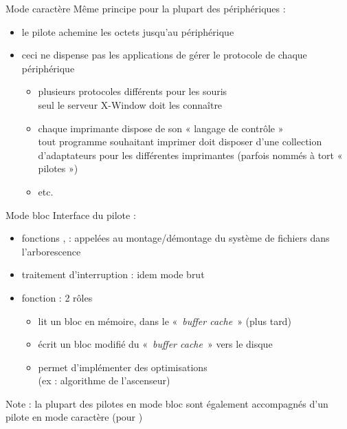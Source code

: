 \begin {frame} {Mode caractère}
    Même principe pour la plupart des périphériques :

    \begin {itemize}
	\item le pilote achemine les octets jusqu'au périphérique
	\item ceci ne dispense pas les applications de gérer le
	    protocole de chaque périphérique

	    \begin {itemize}
		\item plusieurs protocoles différents pour les souris \\
		    \implique seul le serveur X-Window doit les connaître
		\item chaque imprimante dispose de son « langage de
		    contrôle »
		    \\
		    \implique tout programme souhaitant imprimer doit
		    disposer d'une collection d'adaptateurs pour les
		    différentes imprimantes (parfois nommés à tort
		    « pilotes »)
		\item etc.

	    \end {itemize}
    \end {itemize}
\end {frame}

\begin {frame} {Mode bloc}
    Interface du pilote :
    \begin {itemize}
	\item fonctions ,  : appelées au
	    montage/démontage du système de fichiers dans l'arborescence
	\item traitement d'interruption : idem mode brut
	\item fonction  : 2 rôles
	    \begin {itemize}
		\item lit un bloc en mémoire, dans le «~\textit {buffer
		    cache}~» (plus tard)
		\item écrit un bloc modifié du «~\textit {buffer cache}~»
		    vers le disque
		\item permet d'implémenter des optimisations \\
		    (ex : algorithme de l'ascenseur)
	    \end {itemize}
    \end {itemize}

    \vspace* {2mm}

    Note : la plupart des pilotes en mode bloc sont également
    accompagnés d'un pilote en mode caractère (pour )
\end {frame}

